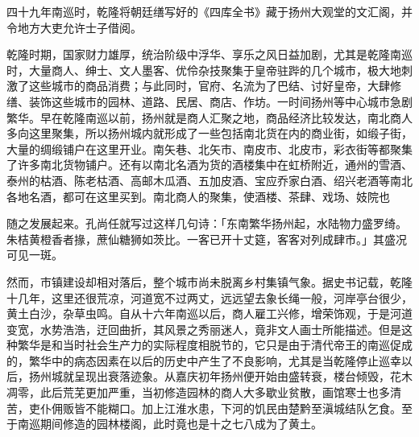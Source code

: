 四十九年南巡时，乾隆将朝廷缮写好的《四库全书》藏于扬州大观堂的文汇阁，并令地方大吏允许士子借阅。


乾隆时期，国家财力雄厚，统治阶级中浮华、享乐之风日益加剧，尤其是乾隆南巡时，大量商人、绅士、文人墨客、优伶杂技聚集于皇帝驻跸的几个城市，极大地刺激了这些城市的商品消费；与此同时，官府、名流为了巴结、讨好皇帝，大肆修缮、装饰这些城市的园林、道路、民居、商店、作坊。一时间扬州等中心城市急剧繁华。早在乾隆南巡以前，扬州就是商人汇聚之地，商品经济比较发达，南北商人多向这里聚集，所以扬州城内就形成了一些包括南北货在内的商业街，如缎子街，大量的绸缎铺户在这里开业。南矢巷、北矢市、南皮市、北皮市，彩衣街等都聚集了许多南北货物铺户。还有以南北名酒为货的酒楼集中在虹桥附近，通州的雪酒、泰州的枯酒、陈老枯酒、高邮木瓜酒、五加皮酒、宝应乔家白酒、绍兴老酒等南北各地名酒，都可在这里买到。南北商人的聚集，使酒楼、茶肆、戏场、妓院也

\vfill
\begin{BookNotes}
\end{BookNotes}

\noindent 随之发展起来。孔尚任就写过这样几句诗：「东南繁华扬州起，水陆物力盛罗绮。朱桔黄橙香者掾，蔗仙糖狮如茨比。一客已开十丈筵，客客对列成肆市。」其盛况可见一斑。

然而，市镇建设却相对落后，整个城市尚未脱离乡村集镇气象。据史书记载，乾隆十几年，这里还很荒凉，河道宽不过两丈，远远望去象长绳一般，河岸亭台很少，黄土白沙，杂草虫鸣。自从十六年南巡以后，商人雇工兴修，增荣饰观，于是河道变宽，水势浩浩，迂回曲折，其风景之秀丽迷人，竟非文人画士所能描述。但是这种繁华是和当时社会生产力的实际程度相脱节的，它只是由于清代帝王的南巡促成的，繁华中的病态因素在以后的历史中产生了不良影响，尤其是当乾隆停止巡幸以后，扬州城就呈现出衰落迹象。从嘉庆初年扬州便开始由盛转衰，楼台倾毁，花木凋零，此后荒芜更加严重，当初修造园林的商人大多歇业贫散，画馆寒士也多清苦，吏仆佣贩皆不能糊口。加上江淮水患，下河的饥民由楚黔至滇城结队乞食。至于南巡期间修造的园林楼阁，此时竟也是十之七八成为了黄土。


